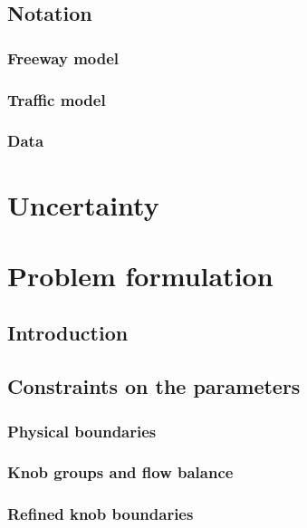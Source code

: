 \subsection{Notation}
\subsubsection{Freeway model}

\label{subsubsec:freeway_notation}
\subsubsection{Traffic model}
\label{subsubsec:traffic_notation}

\subsubsection{Data}
\label{subsubsec:data_notation}



\section{Uncertainty}
\label{sec:uncertainty}



\section{Problem formulation}
\subsection{Introduction}
\label{subsec:problem_formulation_intro}

\subsection{Constraints on the parameters}
\label{subsec:constraintsintro}

\subsubsection{Physical boundaries}
\label{subsubsec:naive}

\subsubsection{Knob groups and flow balance}
\label{subsubsec:knob_groups}

\subsubsection{Refined knob boundaries}
\label{subsubsec:refined}

